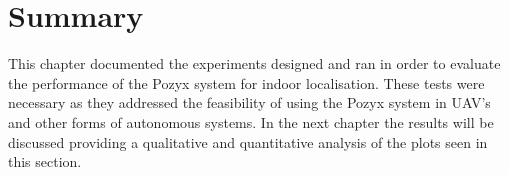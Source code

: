 \section{Summary}
This chapter documented the experiments designed and ran in order to evaluate the performance of the Pozyx system for indoor localisation.
These tests were necessary as they addressed the feasibility of using the Pozyx system in UAV's and other forms of autonomous systems.
In the next chapter the results will be discussed providing a qualitative and quantitative analysis of the plots seen in this section.

